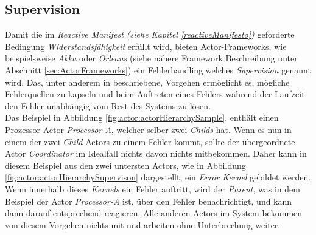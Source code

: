 \subsection{Supervision}\label{actor:supervision}
Damit die im \textit{Reactive Manifest (siehe Kapitel \ref{reactiveManifesto})} geforderte Bedingung \textit{Widerstandsfähigkeit} erfüllt wird, bieten Actor-Frameworks, wie beispielsweise \textit{Akka} oder \textit{Orleans} (siehe nähere Framework Beschreibung unter Abschnitt \ref{sec:ActorFrameworks}) ein Fehlerhandling welches \textit{Supervision} genannt wird. Das, unter anderem in \cite{sargent2016play} beschriebene, Vorgehen ermöglicht es, mögliche Fehlerquellen zu kapseln und beim Auftreten eines Fehlers während der Laufzeit den Fehler unabhängig vom Rest des Systems zu lösen.\\
Das Beispiel in Abbildung \ref{fig:actor:actorHierarchySample}, enthält einen Prozessor Actor \textit{Processor-A}, welcher selber zwei \textit{Childs} hat. Wenn es nun in einem der zwei \textit{Child}-Actors zu einem Fehler kommt, sollte der übergeordnete Actor \textit{Coordinator} im Idealfall nichts davon nichts mitbekommen. Daher kann in diesem Beispiel aus den zwei untersten Actors, wie in Abbildung \ref{fig:actor:actorHierarchySupervison} dargestellt, ein \textit{Error Kernel} gebildet werden. Wenn innerhalb dieses \textit{Kernels} ein Fehler auftritt, wird der \textit{Parent}, was in dem Beispiel der Actor \textit{Processor-A} ist, über den Fehler benachrichtigt, und kann dann darauf entsprechend reagieren. Alle anderen Actors im System bekommen von diesem Vorgehen nichts mit und arbeiten ohne Unterbrechung weiter. \\
